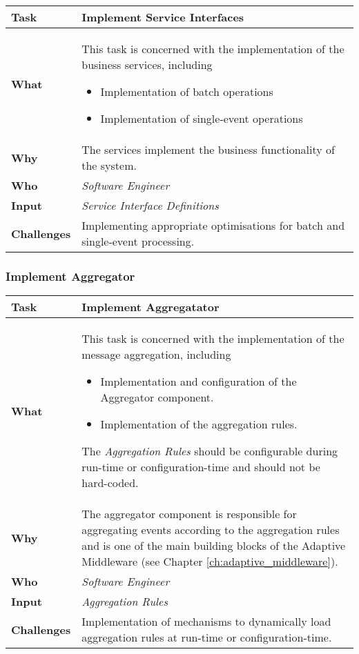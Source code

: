 \begin{tabularx}{\textwidth}{@{} l X @{}}
	\caption{Implement Service Interfaces} \label{table:ch6_Task_Implement_Service_Interfaces}\\
	\toprule 
	\bfseries Task & Implement Service Interfaces\\
	\midrule 
	\bfseries What & 
	This task is concerned with the implementation of the business services, including
	\begin{itemize}
		\item Implementation of batch operations
		\item Implementation of single-event operations
	\end{itemize}
	\\
	\midrule 
	\bfseries Why & The services implement the business functionality of the system.\\
	\midrule 
	\bfseries Who & \emph{Software Engineer}\\
	\midrule 
	\bfseries Input & \emph{Service Interface Definitions}\\
	\midrule 
	\bfseries Challenges & Implementing appropriate optimisations for batch and single-event processing.
	\\
	\bottomrule 
\end{tabularx}

\subsubsection{Implement Aggregator}
\begin{tabularx}{\textwidth}{@{} l X @{}}
	\caption{Implement Aggregator} \label{table:ch6_Task_Implement_Aggregator}\\
	\toprule 
	\bfseries Task & Implement Aggregatator\\
	\midrule 
	\bfseries What & 
	This task is concerned with the implementation of the message aggregation, including
	\begin{itemize}
		\item Implementation and configuration of the Aggregator component.
		\item Implementation of the aggregation rules.
	\end{itemize}
	The \emph{Aggregation Rules} should be configurable during run-time or configuration-time and should not be hard-coded.
	\\
	\midrule 
	\bfseries Why & The aggregator component is responsible for aggregating events according to the aggregation rules and is one of the main building blocks of the Adaptive Middleware (see Chapter \ref{ch:adaptive_middleware}).\\
	\midrule 
	\bfseries Who & \emph{Software Engineer}\\
	\midrule 
	\bfseries Input & \emph{Aggregation Rules}\\
	\midrule 
	\bfseries Challenges & Implementation of mechanisms to dynamically load aggregation rules at run-time or configuration-time.\\
	\bottomrule 
\end{tabularx}

